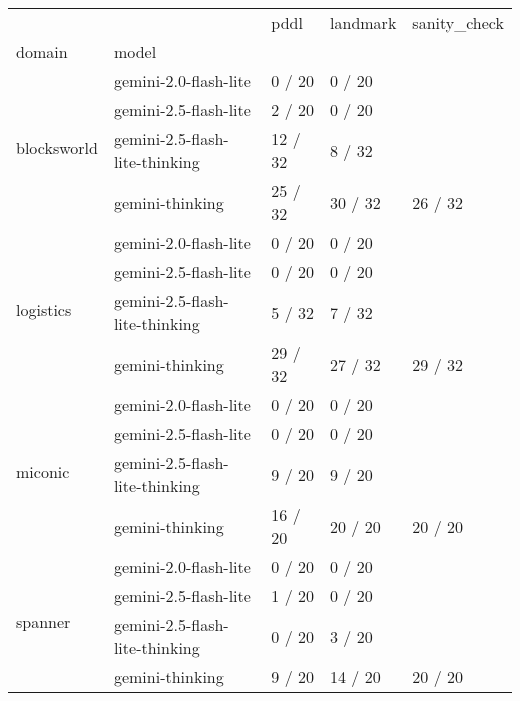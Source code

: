 \begin{tabular}{lllll}
\toprule
 &  & pddl & landmark & sanity\_check \\
domain & model &  &  &  \\
\midrule
\multirow[t]{4}{*}{blocksworld} & gemini-2.0-flash-lite & 0 / 20 & 0 / 20 &  \\
 & gemini-2.5-flash-lite & 2 / 20 & 0 / 20 &  \\
 & gemini-2.5-flash-lite-thinking & 12 / 32 & 8 / 32 &  \\
 & gemini-thinking & 25 / 32 & 30 / 32 & 26 / 32 \\
\cline{1-5}
\multirow[t]{4}{*}{logistics} & gemini-2.0-flash-lite & 0 / 20 & 0 / 20 &  \\
 & gemini-2.5-flash-lite & 0 / 20 & 0 / 20 &  \\
 & gemini-2.5-flash-lite-thinking & 5 / 32 & 7 / 32 &  \\
 & gemini-thinking & 29 / 32 & 27 / 32 & 29 / 32 \\
\cline{1-5}
\multirow[t]{4}{*}{miconic} & gemini-2.0-flash-lite & 0 / 20 & 0 / 20 &  \\
 & gemini-2.5-flash-lite & 0 / 20 & 0 / 20 &  \\
 & gemini-2.5-flash-lite-thinking & 9 / 20 & 9 / 20 &  \\
 & gemini-thinking & 16 / 20 & 20 / 20 & 20 / 20 \\
\cline{1-5}
\multirow[t]{4}{*}{spanner} & gemini-2.0-flash-lite & 0 / 20 & 0 / 20 &  \\
 & gemini-2.5-flash-lite & 1 / 20 & 0 / 20 &  \\
 & gemini-2.5-flash-lite-thinking & 0 / 20 & 3 / 20 &  \\
 & gemini-thinking & 9 / 20 & 14 / 20 & 20 / 20 \\
\cline{1-5}
\end{tabular}